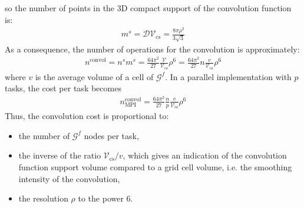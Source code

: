 \documentclass[12pt]{scrartcl}
\begin{document}
so the number of points in the 3D compact support of the convolution function is:
\begin{align}
m^s = \mathcal{D} \mathcal{V}_\mathrm{cs} = \frac{8\pi \rho^3}{3\sqrt{3}} 
\end{align}
As a consequence, the number of operations for the convolution is approximately:
\begin{align}
n^\mathrm{convol} = n^s m^s = \frac{64\pi^2}{27} \frac{\mathcal{V}}{\mathcal{V}_\mathrm{cs}} \rho^6 = \frac{64\pi^2}{27} n \frac{v}{\mathcal{V}_\mathrm{cs}} \rho^6
\end{align}
where $v$ is the average volume of a cell of $\mathcal{G}^f$. In a parallel implementation with $p$ tasks, the cost per task becomes
\begin{align}
n^\mathrm{convol}_\mathrm{MPI} = \frac{64\pi^2}{27} \frac{n}{p} \frac{v}{\mathcal{V}_\mathrm{cs}} \rho^6
\end{align}
Thus, the convolution cost is proportional to:
\begin{itemize}
\item the number of $\mathcal{G}^f$ nodes per task,
\item the inverse of the ratio $\mathcal{V}_\mathrm{cs}/v$, which gives an indication of the convolution function support volume compared to a grid cell volume, i.e. the smoothing intensity of the convolution,
\item the resolution $\rho$ to the power 6.
\end{itemize}
\end{document}
